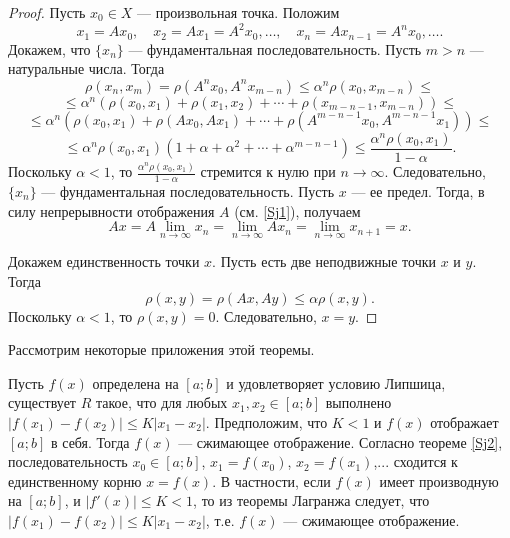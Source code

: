 \documentclass[12pt, titlepage, oneside]{amsbook}
\theoremstyle{definition}
\theoremstyle{remark}
\begin{document}
\begin{proof}
	Пусть $x_0\in X$ --- произвольная точка. Положим $$x_1=Ax_0,\quad x_2=Ax_1=A^2x_0,\ldots,\quad x_n=Ax_{n-1}=A^n x_0,\ldots.$$ Докажем, что $\{x_n\}$ --- фундаментальная последовательность. Пусть $m>n$ --- натуральные числа. Тогда $$\rho(x_n,x_m)=\rho(A^n x_0,A^n x_{m-n})\leq \alpha^n\rho(x_0,x_{m-n})\leq$$ $$\leq\alpha^n(\rho(x_0,x_1)+\rho(x_1,x_2)+\cdots+\rho(x_{m-n-1},x_{m-n}))\leq$$ $$\leq\alpha^n(\rho(x_0,x_1)+\rho(Ax_0,Ax_1)+\cdots+\rho(A^{m-n-1}x_0,A^{m-n-1}x_1))\leq$$ $$\leq\alpha^n\rho(x_0,x_1)(1+\alpha+\alpha^2+\cdots+\alpha^{m-n-1})\leq\frac{\alpha^n\rho(x_0,x_1)}{1-\alpha}.$$ Поскольку $\alpha<1$, то $\frac{\alpha^n\rho(x_0,x_1)}{1-\alpha}$ стремится к нулю при $n\rightarrow\infty$. Следовательно, $\{x_n\}$ --- фундаментальная последовательность. Пусть $x$ --- ее предел. Тогда, в силу непрерывности отображения $A$ (см. \ref{Sj1}), получаем $$Ax=A\lim\limits_{n\rightarrow\infty} x_n=\lim\limits_{n\rightarrow\infty}A x_n=\lim\limits_{n\rightarrow\infty}x_{n+1}=x.$$
	
	Докажем единственность точки $x$. Пусть есть две неподвижные точки $x$ и $y$. Тогда $$\rho(x,y)=\rho(Ax,Ay)\leq\alpha\rho(x,y).$$ Поскольку $\alpha<1$, то $\rho(x,y)=0$. Следовательно, $x=y$.
\end{proof}

Рассмотрим некоторые приложения этой теоремы.

Пусть $f(x)$ определена на $[a;b]$ и удовлетворяет условию Липшица, существует $R$ такое, что для любых $x_1,x_2\in[a;b]$ выполнено $|f(x_1)-f(x_2)|\leq K|x_1-x_2|$. Предположим, что $K<1$ и $f(x)$ отображает $[a;b]$ в себя. Тогда $f(x)$ --- сжимающее отображение. Согласно теореме \ref{Sj2}, последовательность $x_0\in [a;b]$, $x_1=f(x_0)$, $x_2=f(x_1)$,... сходится к единственному корню $x=f(x)$. В частности, если $f(x)$ имеет производную на $[a;b]$, и $|f'(x)|\leq K<1$, то из теоремы Лагранжа следует, что $|f(x_1)-f(x_2)|\leq K|x_1-x_2|$, т.е. $f(x)$ --- сжимающее отображение.
\end{document}
